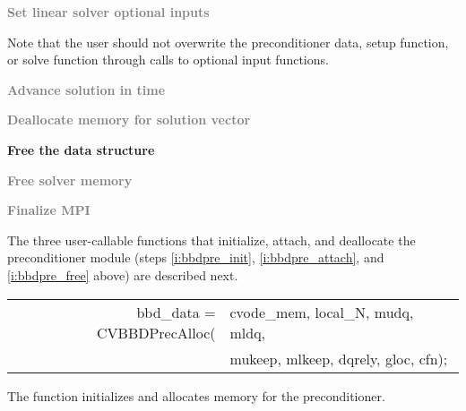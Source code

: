 \begin{Steps}
\item
  \textcolor{gray}{\bf Set linear solver optional inputs}

  Note that the user should not overwrite the preconditioner data, setup function, 
  or solve function through calls to {\cvspgmr} optional input functions.

\item
  \textcolor{gray}{\bf Advance solution in time}

\item
  \textcolor{gray}{\bf Deallocate memory for solution vector}

\item \label{i:bbdpre_free}
  {\bf Free the {\cvbbdpre} data structure}


\item
  \textcolor{gray}{\bf Free solver memory}
  
\item 
  \textcolor{gray}{\bf Finalize MPI}

\end{Steps}
The three user-callable functions that initialize, attach, and deallocate
the {\cvbbdpre} preconditioner module (steps \ref{i:bbdpre_init},
\ref{i:bbdpre_attach}, and \ref{i:bbdpre_free} above) are described
next.
{
   \begin{tabular}[t]{@{}r@{}l@{}}
     bbd\_data = CVBBDPrecAlloc(&cvode\_mem, local\_N, mudq, mldq, \\
                                &mukeep, mlkeep, dqrely, gloc, cfn);
   \end{tabular}
}
{
  The function  initializes and allocates
  memory for the {\cvbbdpre} preconditioner.
}
